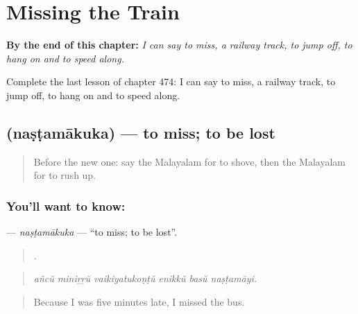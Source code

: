 
\chapter{Missing the Train}
\label{ch:ml-missing-the-train}

\begin{chapteropening}
\textbf{By the end of this chapter:} \emph{I can say to miss, a railway track, to jump off, to hang on and to speed along.}

Complete the last lesson of chapter 474: I can say to miss, a railway track, to jump off, to hang on and to speed along.
\end{chapteropening}

\section[\texorpdfstring{\ml{നഷ്ടമാകുക} (naṣṭamākuka)}{നഷ്ടമാകുക (naṣṭamākuka)}]{ (naṣṭamākuka) — to miss; to be lost}

\label{lesson:ML-C474-nastamakuka}



\begin{quote}
Before the new one: say the Malayalam for to shove, then the Malayalam for to rush up.
\end{quote}

\subsection*{You'll want to know: }
\textbf{} — \emph{naṣṭamākuka} — \textquotedblleft{}to miss; to be lost\textquotedblright{}.

\begin{quote}
     .
\end{quote}

\begin{quote}
\emph{añcŭ miniṟṟŭ vaikiyatukoṇṭŭ enikkŭ basŭ naṣṭamāyi.}
\end{quote}

\begin{quote}
Because I was five minutes late, I missed the bus.
\end{quote}

